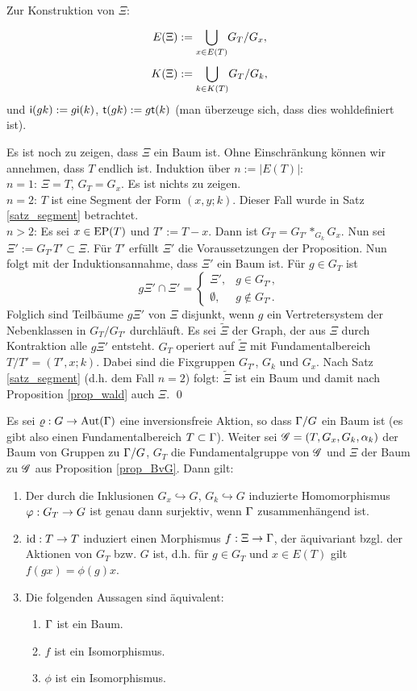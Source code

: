 \documentclass[a4paper, 12pt, twoside]{article}
\begin{document}
\bew Zur Konstruktion von $\Xi$:
\begin{align*}
E(\Xi) &:= \overset{}{\underset{x\in E(T)}{\mathop{\bigcup}}} G_T/G_x, \\
K(\Xi) &:= \overset{}{\underset{k\in K(T)}{\mathop{\bigcup}}} G_T/G_k,
\end{align*}
und $\mathsf{i}(gk):=g \mathsf{i}(k)$, $\mathsf{t}(gk):=g \mathsf{t}(k)$ (man überzeuge sich,
dass dies wohldefiniert ist).

Es ist noch zu zeigen, dass $\Xi$ ein Baum ist. Ohne Einschränkung
können wir annehmen, dass $T$ endlich ist. Induktion über
$n:=|E(T)|$:\\
$n=1$: $\Xi=T$, $G_T=G_x$. Es ist nichts zu zeigen.\\
$n=2$: $T$ ist eine Segment der Form $(x,y;k)$. Dieser Fall wurde
in Satz \ref{satz_segment} betrachtet.\\
$n>2$: Es sei $x\in \mathrm{EP}(T)$ und $T':=T-x$. Dann ist
$G_T=G_{T'}*_{G_k} G_x$. Nun sei $\Xi' := G_{T'} T' \subset \Xi$.
Für $T'$ erfüllt $\Xi'$ die Voraussetzungen der Proposition.
Nun folgt mit der Induktionsannahme, dass $\Xi'$ ein Baum ist.
Für $g\in G_T$ ist
\[
g\Xi' \cap \Xi' =
\left\{
\begin{matrix}
\Xi', &  g\in G_{T'}, \\
\emptyset, & g\not\in G_{T'}.
\end{matrix}\right.
\]
Folglich sind Teilbäume $g\Xi'$ von $\Xi$ disjunkt, wenn $g$ ein
Vertretersystem der Nebenklassen in $G_T/G_{T'}$ durchläuft.
Es sei $\tilde{\Xi}$ der Graph, der aus $\Xi$ durch
Kontraktion alle $g \Xi'$ entsteht. $G_T$ operiert auf $\tilde{\Xi}$
mit Fundamentalbereich $T/T'=(T',x;k)$.
Dabei sind die Fixgruppen $G_{T'}$, $G_k$ und $G_x$.
Nach Satz \ref{satz_segment} (d.h. dem Fall $n=2$) folgt:
$\tilde{\Xi}$ ist ein Baum und damit nach
Proposition \ref{prop_wald} auch $\Xi$.
\qed

\PROP \label{prop_fundbereich}
Es sei $\varrho:G\rightarrow\mathrm{Aut}(\Gamma)$ eine inversionsfreie Aktion,
so dass $\Gamma/G$ ein Baum ist (es gibt also einen Fundamentalbereich
$T\subset \Gamma$).
Weiter sei $\mathscr{G}=(T,G_x,G_k,\alpha_k)$ der Baum von Gruppen zu
$\Gamma/G$, $G_T$ die Fundamentalgruppe von $\mathscr{G}$ und $\Xi$ der
Baum zu $\mathscr{G}$ aus Proposition \ref{prop_BvG}. Dann gilt:
\begin{enumerate}
\item Der durch die Inklusionen $G_x \hookrightarrow G$,
$G_k \hookrightarrow G$ induzierte Homomorphismus
$\varphi:G_T \rightarrow G$ ist genau dann surjektiv, wenn $\Gamma$
zusammenhängend ist.
\item $\mathrm{id}:T\rightarrow T$ induziert einen Morphismus $f:\Xi\rightarrow\Gamma$,
der äquivariant bzgl. der Aktionen von
$G_T$ bzw. $G$ ist, d.h. für $g\in G_T$ und $x\in E(T)$ gilt
$f(gx)=\phi(g)x$.
\item Die folgenden Aussagen sind äquivalent:
\begin{enumerate}
\item $\Gamma$ ist ein Baum.
\item $f$ ist ein Isomorphismus.
\item $\phi$ ist ein Isomorphismus.
\end{enumerate}
\end{enumerate}
\end{document}
